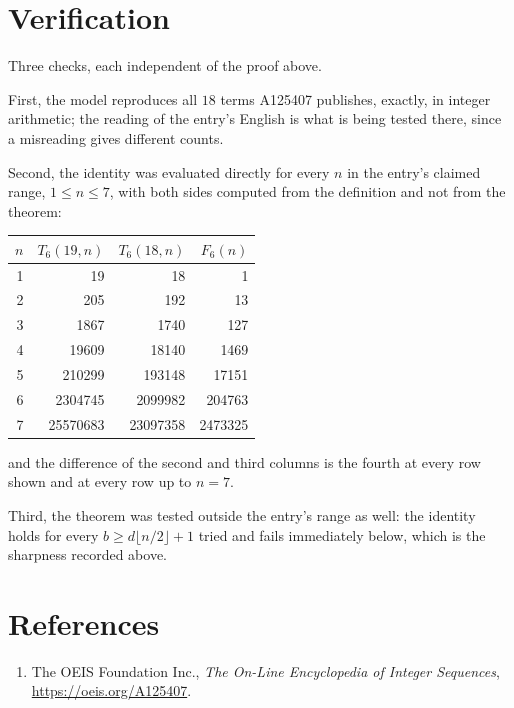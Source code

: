 \documentclass[11pt,a4paper]{article}
\theoremstyle{plain}
\theoremstyle{definition}
\begin{document}
\section{Verification}

Three checks, each independent of the proof above.

First, the model reproduces all $18$ terms A125407 publishes, exactly, in integer
arithmetic; the reading of the entry's English is what is being tested there, since a
misreading gives different counts.

Second, the identity was evaluated directly for every $n$ in the entry's claimed range,
$1\le n\le7$, with both sides computed from the definition and not from the theorem:

\begin{center}
\begin{tabular}{rrrr}
$n$ & $T_{6}(19,n)$ & $T_{6}(18,n)$ & $F_{6}(n)$ \\ \hline
1 & 19 & 18 & 1 \\
2 & 205 & 192 & 13 \\
3 & 1867 & 1740 & 127 \\
4 & 19609 & 18140 & 1469 \\
5 & 210299 & 193148 & 17151 \\
6 & 2304745 & 2099982 & 204763 \\
7 & 25570683 & 23097358 & 2473325 \\
\end{tabular}
\end{center}

\noindent and the difference of the second and third columns is the fourth at every row shown
and at every row up to $n=7$.

Third, the theorem was tested outside the entry's range as well: the identity holds for every
$b\ge d\lfloor n/2\rfloor+1$ tried and fails immediately below, which is the sharpness recorded
above.

\section*{References}
\begin{enumerate}
\item The OEIS Foundation Inc., \emph{The On-Line Encyclopedia of Integer Sequences},
\url{https://oeis.org/A125407}.
\end{enumerate}
\end{document}
